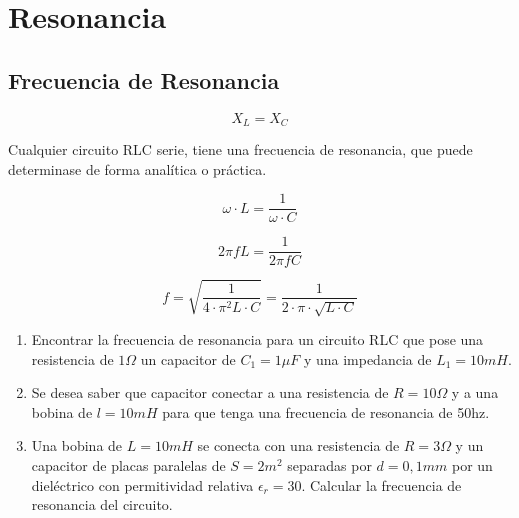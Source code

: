 \documentclass[../main]{subfiles}
\begin{document}
\chapter{Resonancia}

\section{Frecuencia de Resonancia}
\begin{equation}
  X_L=X_C
\end{equation}

Cualquier circuito RLC serie, tiene una frecuencia de resonancia, que
puede determinase de forma analítica o práctica.

\begin{equation}
  \omega \cdot L = \dfrac{1}{\omega \cdot C}
\end{equation}

\begin{equation}
  2 \pi f L = \dfrac{1}{2 \pi f C}
\end{equation}

\begin{equation}
  f=\sqrt{\dfrac{1}{4\cdot \pi^2L \cdot C}} =\dfrac{1}{2 \cdot \pi
  \cdot \sqrt{L \cdot C}}
\end{equation}

\begin{enumerate}
  \item Encontrar la frecuencia de resonancia para un circuito RLC
    que pose una resistencia de $1\Omega$ un capacitor de $C_1=1 \mu
    F$ y una impedancia de $L_1=10mH$.
  \item Se desea saber que capacitor conectar a una resistencia de
    $R=10\Omega$ y a una bobina de $l=10mH$ para que tenga una
    frecuencia de resonancia de 50hz.
  \item Una bobina de $L=10mH$ se conecta con una resistencia de
    $R=3\Omega$ y un capacitor de placas paralelas de $S=2m^2$
    separadas por $d=0,1mm$ por un dieléctrico con permitividad
    relativa $\epsilon_r=30$. Calcular la frecuencia de resonancia del circuito.
\end{enumerate}
\end{document}
